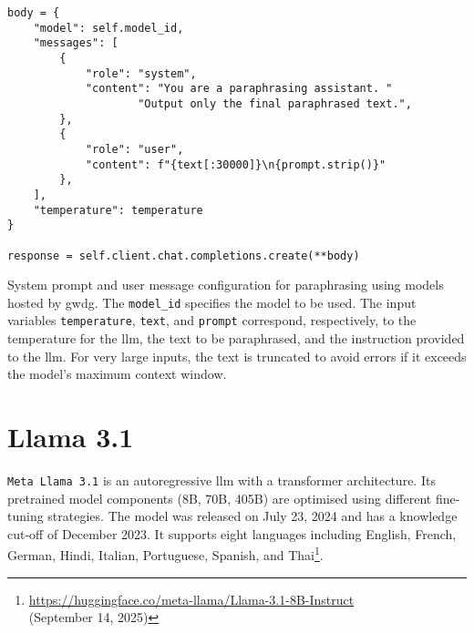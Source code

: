 \begin{listing}[H]
\centering
\begin{verbatim}
body = {
    "model": self.model_id,
    "messages": [
        {
            "role": "system",
            "content": "You are a paraphrasing assistant. "
                    "Output only the final paraphrased text.",
        },
        {
            "role": "user",
            "content": f"{text[:30000]}\n{prompt.strip()}"
        },
    ],
    "temperature": temperature
}

response = self.client.chat.completions.create(**body)
\end{verbatim}
\caption{
System prompt and user message configuration for paraphrasing using models hosted by \ac{gwdg}. 
The \texttt{model\_id} specifies the model to be used. 
The input variables \texttt{temperature}, \texttt{text}, and \texttt{prompt} correspond, respectively, to the temperature for the \ac{llm}, the text to be paraphrased, and the instruction provided to the \ac{llm}.
For very large inputs, the text is truncated to avoid errors if it exceeds the model’s maximum context window.
}
\label{lst:paraphrase_prompt}
\end{listing}



\section{Llama 3.1}

\texttt{Meta Llama 3.1} is an autoregressive \ac{llm} with a transformer architecture.
Its pretrained model components  (8B, 70B, 405B) are optimised using different fine-tuning strategies.
The model was released on July 23, 2024 and has a knowledge cut-off of December 2023.
It supports eight languages including English, French, German, Hindi, Italian, Portuguese, Spanish, and Thai\footnote{\url{https://huggingface.co/meta-llama/Llama-3.1-8B-Instruct} \\(September 14, 2025)}.



